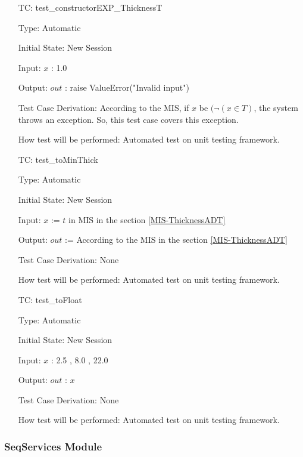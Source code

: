 \documentclass[12pt]{article}
\newcounter{utestnum} %
\begin{document}
\begin{enumerate}[label=TC\arabic*:,ref={\arabic*}]
	
	\item [TC\refstepcounter{utestnum}\theutestnum: \label{ConstructorEXPThicknessTest}] 
	test\_constructorEXP\_ThicknessT
	
	Type: Automatic
	
	Initial State: New Session
	
	Input: $x$ : 1.0
	
	Output: $out$ : raise ValueError("Invalid input") 
	
	Test Case Derivation: According to the MIS, if $x$ be $(\neg (x \in T)$, the system throws an exception. So, this test case covers this exception.
	
	
	How test will be performed: Automated test on unit testing framework.
	
	\item [TC\refstepcounter{utestnum}\theutestnum: \label{toMinThickTest}] 
	test\_toMinThick
	
	Type: Automatic
	
	Initial State: New Session
	
	Input: $x$ := $t$ in MIS in the section \ref{MIS-ThicknessADT}
	
	
	Output: $out$ := According to the MIS in the section \ref{MIS-ThicknessADT}
	
		
	Test Case Derivation: None
	
	How test will be performed: Automated test on unit testing framework.
	
		\item [TC\refstepcounter{utestnum}\theutestnum: \label{toFloatTest}] 
test\_toFloat
	
	Type: Automatic
	
	Initial State: New Session
	
	Input: $x$ : 2.5 , 8.0 , 22.0
	
	Output: $out$ : $x$
	
	
	Test Case Derivation: None
	
	
	How test will be performed: Automated test on unit testing framework.
	
	
	
\end{enumerate}
	
\subsubsection{SeqServices Module}
\end{document}
